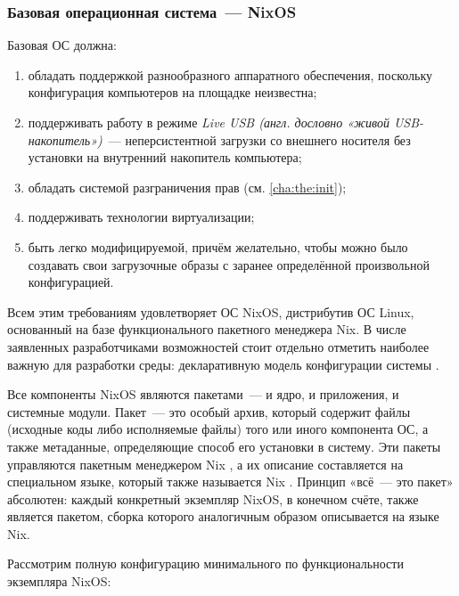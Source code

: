 \subsubsection{Базовая операционная система~--- NixOS}

Базовая ОС должна:

\begin{enumerate}
\item
  обладать поддержкой разнообразного аппаратного обеспечения, поскольку конфигурация компьютеров на площадке неизвестна;
\item
  поддерживать работу в режиме \textit{Live USB (англ. дословно «живой USB-накопитель»)}~--- неперсистентной загрузки со внешнего носителя без установки на внутренний накопитель компьютера;
\item
  обладать системой разграничения прав (см. \ref{cha:the:init});
\item
  поддерживать технологии виртуализации;
\item
  быть легко модифицируемой, причём желательно, чтобы можно было создавать свои загрузочные образы с заранее определённой произвольной конфигурацией.
\end{enumerate}

Всем этим требованиям удовлетворяет ОС NixOS, дистрибутив ОС Linux, основанный на базе функционального пакетного менеджера Nix. В числе заявленных разработчиками возможностей стоит отдельно отметить наиболее важную для разработки среды: декларативную модель конфигурации системы \cite{NixOS}.


Все компоненты NixOS являются пакетами~--- и ядро, и приложения, и системные модули. Пакет~--- это особый архив, который содержит файлы (исходные коды либо исполняемые файлы) того или иного компонента ОС, а также метаданные, определяющие способ его установки в систему. Эти пакеты управляются пакетным менеджером Nix \cite{Nixpkg}, а их описание составляется на специальном языке, который также называется Nix \cite{Nixlang}. Принцип «всё~--- это пакет» абсолютен:  каждый конкретный экземпляр NixOS, в конечном счёте, также является пакетом, сборка которого аналогичным образом описывается на языке Nix.

Рассмотрим полную конфигурацию минимального по функциональности экземпляра NixOS:

